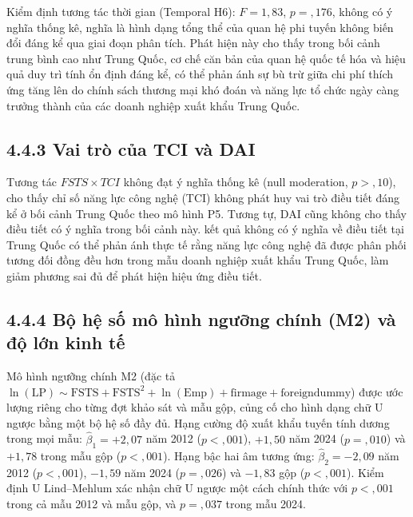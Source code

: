 \documentclass[
  a4paper,
  13pt]{extreport}
\begin{document}
Kiểm định tương tác thời gian (Temporal H6): \(F = 1{,}83\),
\(p = {,}176\), không có ý nghĩa thống kê, nghĩa là hình dạng tổng thể
của quan hệ phi tuyến không biến đổi đáng kể qua giai đoạn phân tích.
Phát hiện này cho thấy trong bối cảnh trung bình cao như Trung Quốc, cơ
chế căn bản của quan hệ quốc tế hóa và hiệu quả duy trì tính ổn định
đáng kể, có thể phản ánh sự bù trừ giữa chi phí thích ứng tăng lên do
chính sách thương mại khó đoán và năng lực tổ chức ngày càng trưởng
thành của các doanh nghiệp xuất khẩu Trung Quốc.

\hypertarget{vai-truxf2-cux1ee7a-tci-vuxe0-dai}{%
\subsection{4.4.3 Vai trò của TCI và
DAI}\label{vai-truxf2-cux1ee7a-tci-vuxe0-dai}}

Tương tác \(FSTS \times TCI\) không đạt ý nghĩa thống kê (null
moderation, \(p > {,}10\)), cho thấy chỉ số năng lực công nghệ (TCI)
không phát huy vai trò điều tiết đáng kể ở bối cảnh Trung Quốc theo mô
hình P5. Tương tự, DAI cũng không cho thấy điều tiết có ý nghĩa trong
bối cảnh này. kết quả không có ý nghĩa về điều tiết tại Trung Quốc có
thể phản ánh thực tế rằng năng lực công nghệ đã được phân phối tương đối
đồng đều hơn trong mẫu doanh nghiệp xuất khẩu Trung Quốc, làm giảm
phương sai đủ để phát hiện hiệu ứng điều tiết.

\hypertarget{bux1ed9-hux1ec7-sux1ed1-muxf4-huxecnh-ngux1b0ux1ee1ng-chuxednh-m2-vuxe0-ux111ux1ed9-lux1edbn-kinh-tux1ebf}{%
\subsection{4.4.4 Bộ hệ số mô hình ngưỡng chính (M2) và độ lớn kinh
tế}\label{bux1ed9-hux1ec7-sux1ed1-muxf4-huxecnh-ngux1b0ux1ee1ng-chuxednh-m2-vuxe0-ux111ux1ed9-lux1edbn-kinh-tux1ebf}}

Mô hình ngưỡng chính M2 (đặc tả
\(\ln(\mathrm{LP}) \sim \mathrm{FSTS} + \mathrm{FSTS}^2 + \ln(\mathrm{Emp}) + \text{firmage} + \text{foreigndummy}\))
được ước lượng riêng cho từng đợt khảo sát và mẫu gộp, củng cố cho hình
dạng chữ U ngược bằng một bộ hệ số đầy đủ. Hạng cường độ xuất khẩu tuyến
tính dương trong mọi mẫu: \(\hat{\beta}_1 = +2{,}07\) năm 2012
(\(p < {,}001\)), \(+1{,}50\) năm 2024 (\(p = {,}010\)) và \(+1{,}78\)
trong mẫu gộp (\(p < {,}001\)). Hạng bậc hai âm tương ứng:
\(\hat{\beta}_2 = -2{,}09\) năm 2012 (\(p < {,}001\)), \(-1{,}59\) năm
2024 (\(p = {,}026\)) và \(-1{,}83\) gộp (\(p < {,}001\)). Kiểm định U
Lind--Mehlum xác nhận chữ U ngược một cách chính thức với \(p < {,}001\)
trong cả mẫu 2012 và mẫu gộp, và \(p = {,}037\) trong mẫu 2024.
\end{document}
